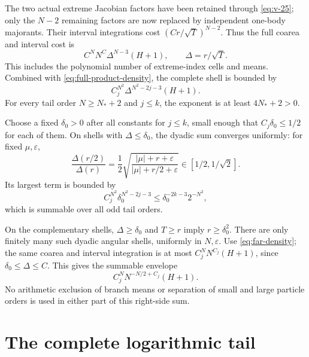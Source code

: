 \documentclass[11pt]{article}
\numberwithin{equation}{section}
\theoremstyle{remark}\newtheorem{remark}[theorem]{Remark}
\begin{document}
The two actual extreme Jacobian factors have been retained through
\eqref{eq:v-25}; only the $N-2$ remaining factors are now replaced by
independent one-body majorants. Their interval integrations cost
$(Cr/\sqrt T)^{N-2}$. Thus the full coarea and interval cost is
\[
 C^NN^{C}\Delta^{N-3}(H+1),\qquad \Delta=r/\sqrt T.
\]
This includes the polynomial number of extreme-index cells and means.
Combined with \eqref{eq:full-product-density}, the complete shell is
bounded by
\begin{equation}\label{eq:v-28}
 C_j^{N^2}\Delta^{N^2-2j-3}(H+1).
\end{equation}
For every tail order $N\ge N_*+2$ and $j\le k$, the exponent
is at least $4N_*+2>0$.

Choose a fixed $\delta_0>0$ after all constants for $j\le k$,
small enough that $C_j\delta_0\le1/2$ for each of them.
On shells with $\Delta\le\delta_0$, the dyadic sum converges
uniformly: for fixed $\mu,\varepsilon$,
\[
 \frac{\Delta(r/2)}{\Delta(r)}
 =\frac12\sqrt{\frac{|\mu|+r+\varepsilon}
 {|\mu|+r/2+\varepsilon}}\in[1/2,1/\sqrt2].
\]
Its largest term is bounded by
\[
 C_j^{N^2}\delta_0^{N^2-2j-3}
 \le \delta_0^{-2k-3}2^{-N^2},
\]
which is summable over all odd tail orders.

On the complementary shells, $\Delta\ge\delta_0$ and
$T\ge r$ imply $r\ge\delta_0^2$. There are only finitely many
such dyadic angular shells, uniformly in $N,\varepsilon$.
Use \eqref{eq:far-density}; the same coarea and interval
integration is at most $C_j^NN^{C_j}(H+1)$, since
$\delta_0\le\Delta\le C$.
This gives the summable envelope
\[
 C_j^NN^{-N/2+C_j}(H+1).
\]
No arithmetic exclusion of branch means or separation of small and
large particle orders is used in either part of this right-side sum.

\section{The complete logarithmic tail}
\label{sec:constrained-tail-sum}
\end{document}
